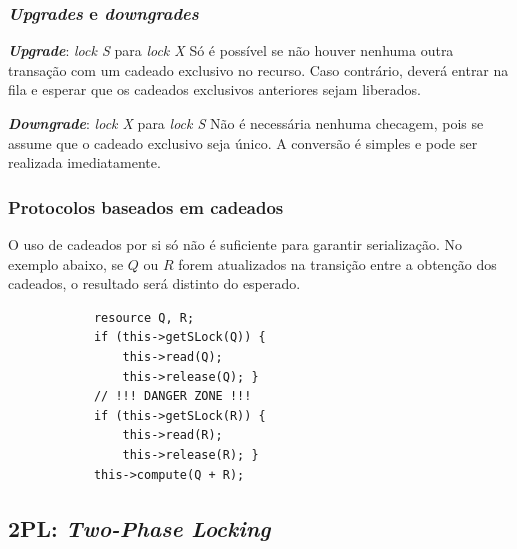 \documentclass{beamer}
\begin{document}
\begin{frame} %
    \frametitle{\emph{Upgrades} e \emph{downgrades}}

    \begin{block}{\textbf{\emph{Upgrade}}: \emph{lock S} para \emph{lock X}}
        Só é possível se não houver nenhuma outra transação com um cadeado exclusivo no recurso. Caso contrário, deverá entrar na fila e esperar que os cadeados exclusivos anteriores sejam liberados.
    \end{block}

    \medskip
    \begin{block}{\textbf{\emph{Downgrade}}: \emph{lock X} para \emph{lock S}}
        Não é necessária nenhuma checagem, pois se assume que o cadeado exclusivo seja único. A conversão é simples e pode ser realizada imediatamente.
    \end{block}

\end{frame}


\begin{frame}[fragile] %
    \frametitle{Protocolos baseados em cadeados}

    O uso de cadeados por si só não é suficiente para garantir serialização. No exemplo abaixo, se $Q$ ou $R$ forem atualizados na transição entre a obtenção dos cadeados, o resultado será distinto do esperado.

    \medskip

    \begin{example}
        \begin{verbatim}
            resource Q, R;
            if (this->getSLock(Q)) {
                this->read(Q);
                this->release(Q); }
            // !!! DANGER ZONE !!!
            if (this->getSLock(R)) {
                this->read(R);
                this->release(R); }
            this->compute(Q + R);
        \end{verbatim}
    \end{example}

\end{frame}


\subsection{2PL: \emph{Two-Phase Locking}}
\end{document}

